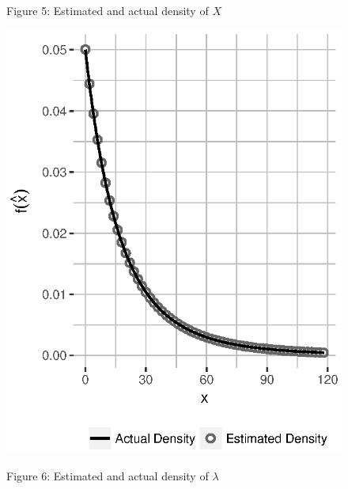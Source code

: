 \documentclass[11pt, oneside]{article}
\newcommand*{\figuretitle}[1]{
    {\centering
    \tiny{#1}
    \par\medskip}
}
\begin{document}
\begin{figure}[h]
   \begin{minipage}{0.45\textwidth}
      \figuretitle{Figure 5: Estimated and actual density of $X$}
      \centering\includegraphics[scale=0.35]{Figure5}
    \end{minipage}
    \begin{minipage}{0.45\textwidth}
      \figuretitle{Figure 6: Estimated and actual density of $\lambda$}

\end{minipage}
\end{figure}
\end{document}
